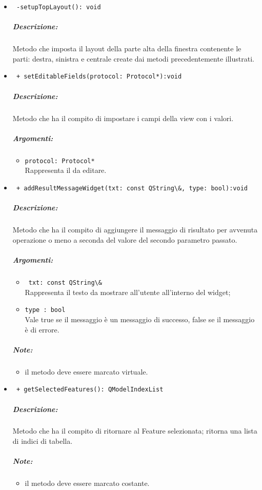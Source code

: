 \begin{itemize}
\item \color{blue}\verb! -setupTopLayout(): void!
\color{black}
\subparagraph{Descrizione:} Metodo che imposta il layout della parte alta della finestra contenente le parti: destra, sinistra e centrale create dai metodi precedentemente illustrati.

\item\color{blue}\verb! + setEditableFields(protocol: Protocol*):void!
\color{black} 
\subparagraph{Descrizione:}
Metodo che ha il compito di impostare i campi della view con i valori.
\subparagraph{Argomenti:}
\begin{itemize}
\item \color{RoyalPurple}\verb!protocol: Protocol* ! \\Rappresenta il \protocol{} da editare.
\end{itemize}

\item \color{blue} \verb! + addResultMessageWidget(txt: const QString\&, type: bool):void! 
\color{black}
\subparagraph{Descrizione:} Metodo che ha il compito di aggiungere il messaggio di risultato per avvenuta operazione o meno a seconda del valore del secondo parametro passato.
\subparagraph{Argomenti:}
\begin{itemize}
\item \color{RoyalPurple} \verb! txt: const QString\& ! \\Rappresenta il testo da mostrare all'utente all'interno del widget;
\item \color{RoyalPurple} \verb!type : bool ! \\ Vale true se il messaggio è un messaggio di successo, false se il messaggio è di errore.
\end{itemize}
\subparagraph{Note:}
\begin{itemize}
\item il metodo deve essere marcato virtuale.
\end{itemize}

\item \color{blue} \verb! + getSelectedFeatures(): QModelIndexList! 
\color{black}
\subparagraph{Descrizione:} Metodo che ha il compito di ritornare  al Feature\g{} selezionata; ritorna una lista di indici di tabella.
\subparagraph{Note:}
\begin{itemize}
\item il metodo deve essere marcato costante.
\end{itemize}


\end{itemize}

